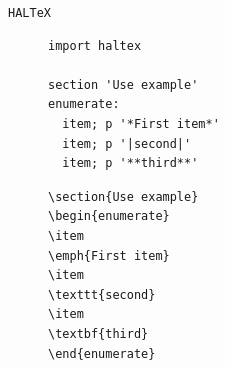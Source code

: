 \documentclass{beamer}
\begin{document}
\begin{frame}[fragile]{\texttt{HALTeX}}
\begin{figure}[h!]
\begin{lstlisting}[language=hal]
import haltex

section 'Use example'
enumerate:
  item; p '*First item*'
  item; p '|second|'
  item; p '**third**'
\end{lstlisting}
\begin{lstlisting}[language=output]
\section{Use example}
\begin{enumerate}
\item
\emph{First item}
\item
\texttt{second}
\item
\textbf{third}
\end{enumerate}
\end{lstlisting}
\label{haltex}
\end{figure}
\end{frame}
\end{document}
